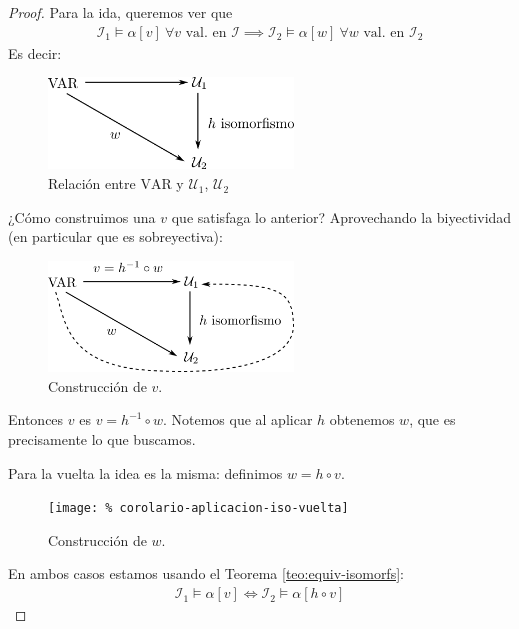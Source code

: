 \begin{proof} \phantom{.}

    Para la ida, queremos ver que 
    \begin{gather*}
        \mathcal{I}_1 \vDash \alpha[v] ~ \forall v 
        \text{ val. en } \mathcal{I}
        \implies \mathcal{I}_2 \vDash \alpha[w] ~ \forall w \text{ val. en }
        \mathcal{I}_2
    \end{gather*}
    Es decir:
    \begin{figure}[H]
        \centering
        \includegraphics[width=0.58\textwidth]{corolario-aplicacion-iso-ida-1}
        \caption{Relación entre $\mathrm{VAR}$ y $\mathcal{U}_1$, 
        $\mathcal{U}_2$}
    \end{figure}
    ¿Cómo construimos una $v$ que satisfaga lo anterior? Aprovechando la
    biyectividad (en particular que es sobreyectiva):
    \begin{figure}[H]
        \centering
        \includegraphics[width=0.58\textwidth]{corolario-aplicacion-iso-ida-2}
        \caption{Construcción de $v$.}
    \end{figure}
    Entonces $v$ es $v = h^{-1} \circ w$. Notemos que al aplicar $h$ 
    obtenemos $w$, que es precisamente lo que buscamos.

    Para la vuelta la idea es la misma: definimos $w = h \circ v$.
    \begin{figure}[H]
        \centering
        \texttt{[image: \%
            corolario-aplicacion-iso-vuelta]}
        \caption{Construcción de $w$.}
    \end{figure}
    En ambos casos estamos usando el Teorema \ref{teo:equiv-isomorfs}:
    \begin{gather*}
        \mathcal{I}_1 \vDash \alpha[v] 
        \iff \mathcal{I}_2 \vDash \alpha [h \circ v] 
    \end{gather*}
\end{proof}

